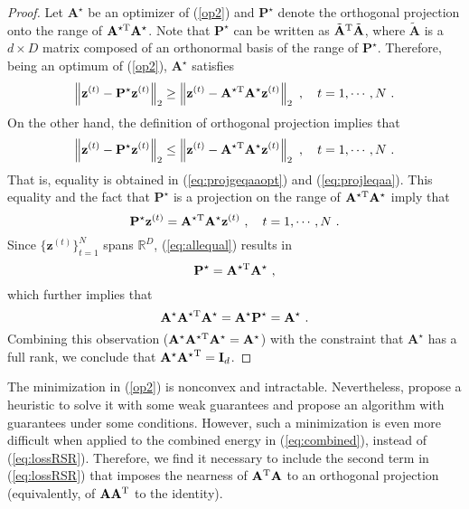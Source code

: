 \documentclass{article} \usepackage{iclr2020_conference,times}
\def\eqref#1{(\ref{#1})}
\def\rvz{{\mathbf{z}}}
\def\rmA{{\mathbf{A}}}
\def\rmI{{\mathbf{I}}}
\def\rmP{{\mathbf{P}}}
\newcommand{\R}{\mathbb{R}}
\newcommand{\norm}[1]{\left\lVert#1\right\rVert}
\begin{document}
\begin{proof}

Let $\rmA^{\star}$ be an optimizer of \eqref{op2} and $\rmP^{\star}$ denote the orthogonal projection onto the range of $\rmA^{\star \rm{T}} \rmA^{\star}$. Note that $\rmP^{\star}$ can be written as $\tilde{\rmA}^{\rm{T}} \tilde{\rmA}$, where $\tilde{\rmA}$ is a $d \times D$ matrix composed of an orthonormal basis of the range of $\rmP^{\star}$. Therefore, being an optimum of \eqref{op2}, $\rmA^{\star}$ satisfies
\begin{equation}\label{eq:projgeqaaopt}
    \norm{\rvz^{(t)} - \rmP^{\star} \rvz^{(t)}}_2 \geq \norm{\rvz^{(t)} - \rmA^{\star \rm{T}} \rmA^{\star} \rvz^{(t)}}_2 ~, \quad t = 1, \cdots, N ~.
\end{equation}
On the other hand, the definition of orthogonal projection implies that
\begin{equation}\label{eq:projleqaa}
    \norm{\rvz^{(t)} - \rmP^{\star} \rvz^{(t)}}_2 \leq \norm{\rvz^{(t)} - \rmA^{\star \rm{T}} \rmA^{\star} \rvz^{(t)}}_2 ~, \quad t = 1, \cdots, N ~.
\end{equation}
That is, equality is obtained in \eqref{eq:projgeqaaopt} and \eqref{eq:projleqaa}. This equality and the fact that $\rmP^{\star}$ is a projection on the range of $\rmA^{\star \rm{T}} \rmA^{\star}$ imply that  
\begin{equation}\label{eq:allequal}
    \rmP^{\star} \rvz^{(t)} = \rmA^{\star \rm{T}} \rmA^{\star} \rvz^{(t)} ~, \quad t = 1, \cdots, N ~.
\end{equation}
Since $\{\rvz^{(t)}\}_{t=1}^N$ spans $\R^D$, \eqref{eq:allequal} results in
\begin{equation}
    \rmP^{\star} = \rmA^{\star \rm{T}} \rmA^{\star} ~,
\end{equation}
which further implies that 
\begin{equation}
\rmA^{\star} \rmA^{\star \rm{T}} \rmA^{\star} = \rmA^{\star} \rmP^{\star} = \rmA^{\star} ~.
\end{equation}
Combining this observation ($\rmA^{\star} \rmA^{\star \rm{T}} \rmA^{\star} = \rmA^{\star}$) with the constraint that $\rmA^{\star}$ has a full rank, we conclude that $\rmA^{\star} {\rmA^{\star}}^{\rm{T}} = \rmI_d$.

\end{proof}

The minimization in \eqref{op2} is nonconvex and intractable. Nevertheless, \citet{lerman2017fast} propose a heuristic to solve it with some weak guarantees 
and \citet{maunu2017well} propose an algorithm with guarantees under some conditions.
However, such a minimization is even more difficult when applied to the combined energy in \eqref{eq:combined}, instead of \eqref{eq:lossRSR}. Therefore, we find it necessary to include the second term in \eqref{eq:lossRSR} that imposes the nearness of $\rmA^{\rm{T}} \rmA$ to an orthogonal projection (equivalently, of $ \rmA \rmA^{\rm{T}}$ to the identity). 
\end{document}
